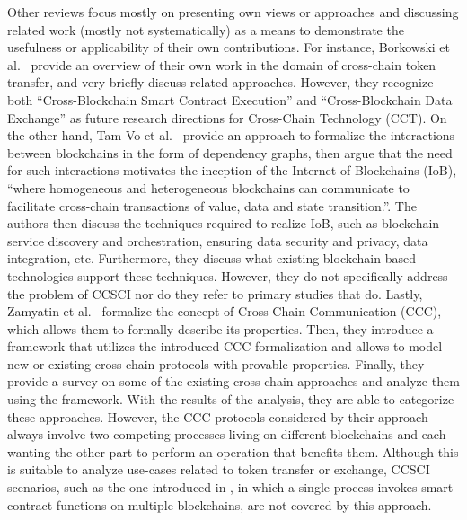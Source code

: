 \documentclass[review]{elsarticle}
\begin{document}
Other reviews focus mostly on presenting own views or approaches and discussing related work (mostly not systematically) as a means to demonstrate the usefulness or applicability of their own contributions.
For instance, Borkowski et al.~\cite{Borkowski2019} provide an overview of their own work in the domain of cross-chain token transfer, and very briefly discuss related approaches.
However, they recognize both \enquote{Cross-Blockchain Smart Contract Execution} and \enquote{Cross-Blockchain Data Exchange} as future research directions for Cross-Chain Technology (CCT).
On the other hand, Tam Vo et al.~\cite{TamVo2018InternetOfBlockchain} provide an approach to formalize the interactions between blockchains in the form of dependency graphs, then argue that the need for such interactions motivates the inception of the Internet-of-Blockchains (IoB), \enquote{where homogeneous and heterogeneous blockchains can communicate to facilitate cross-chain transactions of value, data and state transition.}.
The authors then discuss the techniques required to realize IoB, such as blockchain service discovery and orchestration, ensuring data security and privacy, data integration, etc.
Furthermore, they discuss what existing blockchain-based technologies support these techniques.
However, they do not specifically address the problem of CCSCI nor do they refer to primary studies that do.
Lastly, Zamyatin et al.~\cite{Zamyatin2019SoKCA} formalize the concept of Cross-Chain Communication (CCC), which allows them to formally describe its properties.
Then, they introduce a framework that utilizes the introduced CCC formalization and allows to model new or existing cross-chain protocols with provable properties.
Finally, they provide a survey on some of the existing cross-chain approaches and analyze them using the framework.
With the results of the analysis, they are able to categorize these approaches.
However, the CCC protocols considered by their approach always involve two competing processes living on different blockchains and each wanting the other part to perform an operation that benefits them.
Although this is suitable to analyze use-cases related to token transfer or exchange, CCSCI scenarios, such as the one introduced in , in which a single process invokes smart contract functions on multiple blockchains, are not covered by this approach.
\end{document}
